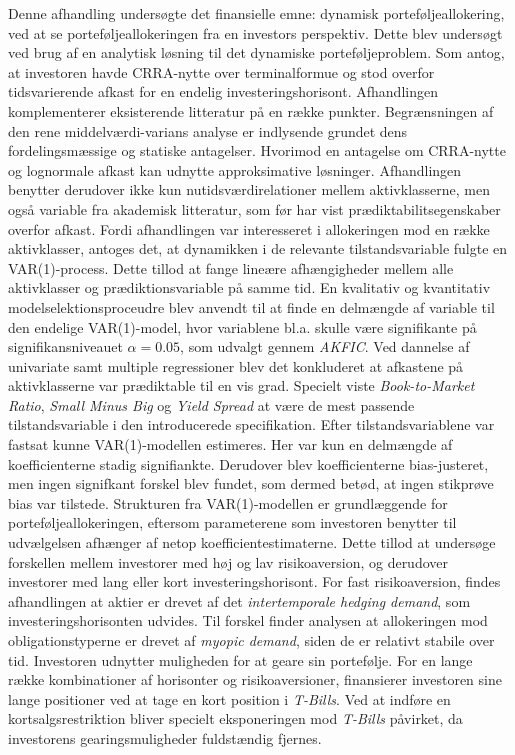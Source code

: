 \documentclass[
  a4paper,
  oneside]{memoir}
\begin{document}
Denne afhandling undersøgte det finansielle emne: dynamisk porteføljeallokering, ved at se porteføljeallokeringen fra en investors perspektiv. Dette blev undersøgt ved brug af en analytisk løsning til det dynamiske porteføljeproblem. Som antog, at investoren havde CRRA-nytte over terminalformue og stod overfor tidsvarierende afkast for en endelig investeringshorisont. Afhandlingen komplementerer eksisterende litteratur på en række punkter. Begrænsningen af den rene middelværdi-varians analyse er indlysende grundet dens fordelingsmæssige og statiske antagelser. Hvorimod en antagelse om CRRA-nytte og lognormale afkast kan udnytte approksimative løsninger. Afhandlingen benytter derudover ikke kun nutidsværdirelationer mellem aktivklasserne, men også variable fra akademisk litteratur, som før har vist prædiktabilitsegenskaber overfor afkast. Fordi afhandlingen var interesseret i allokeringen mod en række aktivklasser, antoges det, at dynamikken i de relevante tilstandsvariable fulgte en VAR(1)-process. Dette tillod at fange lineære afhængigheder mellem alle aktivklasser og prædiktionsvariable på samme tid. En kvalitativ og kvantitativ modelselektionsproceudre blev anvendt til at finde en delmængde af variable til den endelige VAR(1)-model, hvor variablene bl.a. skulle være signifikante på signifikansniveauet \(\alpha=0.05\), som udvalgt gennem \emph{AKFIC}. Ved dannelse af univariate samt multiple regressioner blev det konkluderet at afkastene på aktivklasserne var prædiktable til en vis grad. Specielt viste \emph{Book-to-Market Ratio}, \emph{Small Minus Big} og \emph{Yield Spread} at være de mest passende tilstandsvariable i den introducerede specifikation. Efter tilstandsvariablene var fastsat kunne VAR(1)-modellen estimeres. Her var kun en delmængde af koefficienterne stadig signifiankte. Derudover blev koefficienterne bias-justeret, men ingen signifkant forskel blev fundet, som dermed betød, at ingen stikprøve bias var tilstede. Strukturen fra VAR(1)-modellen er grundlæggende for porteføljeallokeringen, eftersom parameterene som investoren benytter til udvælgelsen afhænger af netop koefficientestimaterne. Dette tillod at undersøge forskellen mellem investorer med høj og lav risikoaversion, og derudover investorer med lang eller kort investeringshorisont. For fast risikoaversion, findes afhandlingen at aktier er drevet af det \emph{intertemporale hedging demand}, som investeringshorisonten udvides. Til forskel finder analysen at allokeringen mod obligationstyperne er drevet af \emph{myopic demand}, siden de er relativt stabile over tid. Investoren udnytter muligheden for at geare sin portefølje. For en lange række kombinationer af horisonter og risikoaversioner, finansierer investoren sine lange positioner ved at tage en kort position i \emph{T-Bills}. Ved at indføre en kortsalgsrestriktion bliver specielt eksponeringen mod \emph{T-Bills} påvirket, da investorens gearingsmuligheder fuldstændig fjernes.
\end{document}
